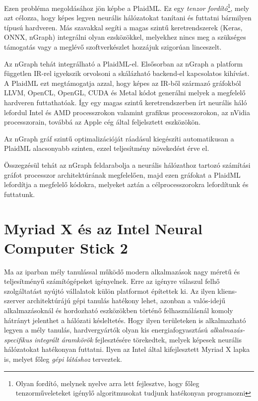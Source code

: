 Ezen probléma megoldásához jön képbe a PlaidML. Ez egy \emph{tenzor fordító}\footnote{Olyan fordító, melynek nyelve arra lett fejlesztve, hogy főleg tenzorműveleteket igénylő algoritmusokat tudjunk hatékonyan programozni}, mely azt célozza, hogy képes legyen neurális hálózatokat tanítani és futtatni bármilyen típusú hardveren. Más szavakkal segíti a magas szintű keretrendszerek (Keras, ONNX, nGraph) integrálni olyan ezsközökkel, melyekhez nincs meg a szükséges támogatás vagy a meglévő szoftverkészlet hozzájuk szigorúan linceszelt.\cite{github:PlaidML}\cite{web:PlaidML}


Az nGraph tehát integrálható a PlaidML-el. Elsősorban az nGraph a platform független IR-rel igyekszik orvolsoni a skálázható backend-el kapcsolatos kihívást. A PlaidML ezt megtámogatja azzal, hogy képes az IR-ből származó gráfokból LLVM, OpenCL, OpenGL, CUDA és Metal kódot generálni melyek a megfelelő hardveren futtathatóak. Így egy magas szintű keretrendszerben írt neurális háló lefordul Intel és AMD processzrokon valamint grafikus processzorokon, az nVidia processzorain, továbbá az Apple cég által feljelsztett eszközökön.

Az nGraph gráf szintű optimalizációját ráadásul kiegészíti automatikusan a PlaidML alacsonyabb szinten, ezzel teljesítmény növekedést érve el.

Összegzésül tehát az nGraph feldarabolja a neurális hálózathoz tartozó számítási gráfot processzor architektúrának megfelelően, majd ezen gráfokat a PlaidML lefordítja a megfelelő kódokra, melyeket aztán a célprocesszorokra lefordítunk és futtatunk.

\section{Myriad X és az Intel Neural Computer Stick 2}
Ma az iparban mély tanulással működő modern alkalmazások nagy méretű és teljesítményű számítógépeket igényelnek. Erre az igényre válaszul felhő szolgáltatást nyújtó vállalatok külön platformot építettek ki. Az ilyen kliens-szerver architektúrájú gépi tanulás hatékony lehet, azonban a valós-idejű alkalmazásoknál és hordozható eszközökben történő felhasználásnál komoly hátrányt jelenthet a hálózati késleltetés. Hogy ilyen területeken is alkalmazható legyen a mély tanulás, hardvergyártók olyan kis energiafogyasztású \emph{alkalmazás-specifikus integrált áramkörök} fejlesztésére törekedtek, melyek képesek neurális hálózatokat hatékonyan futtatni. Ilyen az Intel által kifejlesztett Myriad X lapka is, melyet főleg \emph{gépi látáshoz} terveztek.

